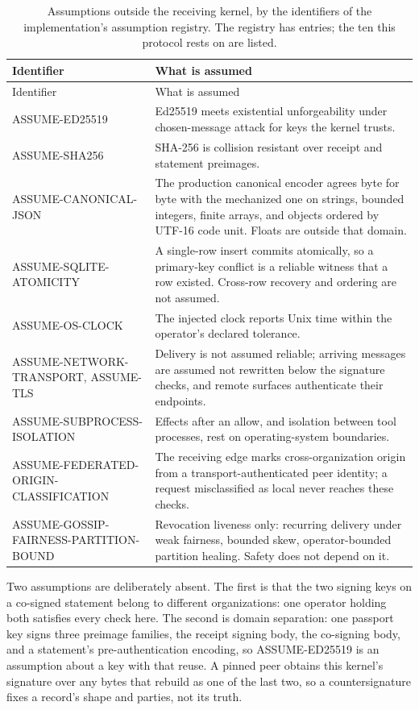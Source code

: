 \scriptsize
\begin{longtable}{@{}>{\raggedright\arraybackslash}p{4.3cm}p{10.9cm}@{}}
\caption{Assumptions outside the receiving kernel, by the identifiers of the implementation's assumption registry. The registry has \PSAssumptionCount{} entries; the ten this protocol rests on are listed.}\label{tab:assumptions}\\
\toprule
Identifier & What is assumed \\
\midrule
\endfirsthead
\toprule
Identifier & What is assumed \\
\midrule
\endhead
\bottomrule
\endfoot
ASSUME-ED25519 & Ed25519 meets existential unforgeability under chosen-message attack for keys the kernel trusts. \\
ASSUME-SHA256 & SHA-256 is collision resistant over receipt and statement preimages. \\
ASSUME-CANONICAL-JSON & The production canonical encoder agrees byte for byte with the mechanized one on strings, bounded integers, finite arrays, and objects ordered by UTF-16 code unit. Floats are outside that domain. \\
ASSUME-SQLITE-ATOMICITY & A single-row insert commits atomically, so a primary-key conflict is a reliable witness that a row existed. Cross-row recovery and ordering are not assumed. \\
ASSUME-OS-CLOCK & The injected clock reports Unix time within the operator's declared tolerance. \\
ASSUME-NETWORK-TRANSPORT, ASSUME-TLS & Delivery is not assumed reliable; arriving messages are assumed not rewritten below the signature checks, and remote surfaces authenticate their endpoints. \\
ASSUME-SUBPROCESS-ISOLATION & Effects after an allow, and isolation between tool processes, rest on operating-system boundaries. \\
ASSUME-FEDERATED-ORIGIN-CLASSIFICATION & The receiving edge marks cross-organization origin from a transport-authenticated peer identity; a request misclassified as local never reaches these checks. \\
ASSUME-GOSSIP-FAIRNESS-PARTITION-BOUND & Revocation liveness only: recurring delivery under weak fairness, bounded skew, operator-bounded partition healing. Safety does not depend on it. \\
\end{longtable}
\normalsize

Two assumptions are deliberately absent. The first is that the two signing keys
on a co-signed statement belong to different organizations: one operator holding
both satisfies every check here. The second is domain separation: one passport
key signs three preimage families, the receipt signing body, the co-signing
body, and a statement's pre-authentication encoding, so ASSUME-ED25519 is an
assumption about a key with that reuse. A pinned peer obtains this kernel's
signature over any bytes that rebuild as one of the last two, so a
countersignature fixes a record's shape and parties, not its truth.
